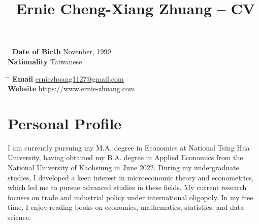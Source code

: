 \documentclass[utf8, 12pt]{article} %
\begin{document}
\fontsize{12}{18pt}\selectfont %


\title{Ernie Cheng-Xiang Zhuang -- CV} %


\parbox{0.5\textwidth}{ %
\begin{tabbing}
\hspace{3cm} \= \hspace{4cm} \= \kill %
{\bf Date of Birth}  Novenber, 1999 \\ %
{\bf Nationality} \> Taiwanese %
\end{tabbing}}
%
\hfill %
%
\parbox{0.5\textwidth}{ %
\begin{tabbing}
\hspace{3cm} \= \hspace{4cm} \= \kill %
{\bf Email} \> \href{mailto:john@smith.com}{erniezhuang1127@gmail.com} \\ %
{\bf Website} \> \href{https://www.ernie-zhuang.com}{https://www.ernie-zhuang.com} %
\end{tabbing}}


\section{Personal Profile}

I am currently pursuing my M.A. degree in Economics at National Tsing Hua University, having obtained my B.A. degree in Applied Economics from the National University of Kaohsiung in June 2022. During my undergraduate studies, I developed a keen interest in microeconomic theory and econometrics, which led me to pursue advanced studies in these fields. My current research focuses on trade and industrial policy under international oligopoly. In my free time, I enjoy reading books on economics, mathematics, statistics, and data science.\\
\end{document}
